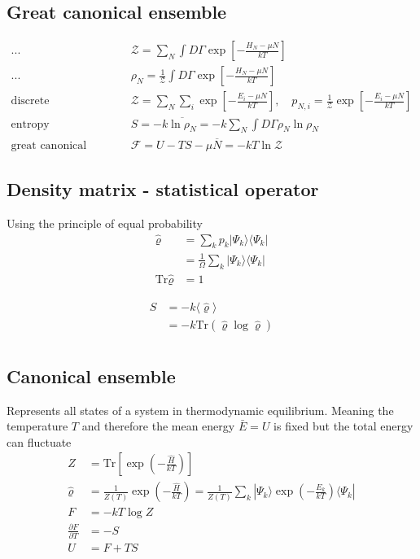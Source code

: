 \documentclass[../main.tex]{subfiles}
\begin{document}
\subsection{Great canonical ensemble}
\begin{eqnarray}
\text{...} & \mathcal{Z}=\sum_N\int D\Gamma\exp[-\frac{H_N-\mu N}{kT}]\\
\text{...} & \rho_N=\frac{1}{\mathcal{Z}}\int D\Gamma\exp[-\frac{H_N-\mu N}{kT}]\\
\text{discrete} & \mathcal{Z}=\sum_N\sum_i\exp[-\frac{E_i-\mu N}{kT}],\quad p_{N,i}=\frac{1}{\mathcal{Z}}\exp[-\frac{E_i-\mu N}{kT}]\\
\text{entropy} & S=-k\overline{\ln\rho_N}=-k\sum_N\int D\Gamma\rho_N\ln\rho_N\\
\text{great canonical potential} & \mathcal{F}=U-TS-\mu\overline{N}=-kT\ln\mathcal{Z}
\end{eqnarray}

\subsection{Density matrix - statistical operator}
Using the principle of equal probability
\begin{align}
\hat{\varrho}&=\sum_k p_k|\Psi_k\rangle\langle\Psi_k|\\
&=\frac{1}{\Omega}\sum_k |\Psi_k\rangle\langle\Psi_k|\\
\text{Tr}\hat\varrho&=1
\end{align}

\begin{align}
S
&=-k\langle\hat\varrho\rangle\\
&=-k\text{Tr}(\hat\varrho\log\hat\varrho)\\
\end{align}

\subsection{Canonical ensemble}
Represents all states of a system in thermodynamic equilibrium. Meaning the temperature $T$ and therefore the mean energy $\bar{E}=U$ is fixed but the total energy can fluctuate
\begin{align}
Z&=\text{Tr}\left[\exp\left(-\frac{\hat{H}}{kT}\right)\right]\\
\hat{\varrho}&=\frac{1}{Z(T)}\exp\left(-\frac{\hat{H}}{kT}\right)=\frac{1}{Z(T)}\sum_k|\Psi_k\rangle\exp\left(-\frac{E_k}{kT}\right)\langle\Psi_k|\\
F&=-kT\log Z\\
\frac{\partial F}{\partial T}&=-S\\
U&=F+TS
\end{align}
\end{document}

